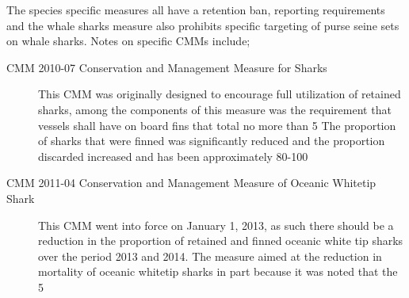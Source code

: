 \documentclass[12pt]{SCreport}
\begin{document}
The species specific measures all have a retention ban, reporting requirements and the whale sharks measure also prohibits specific targeting of purse seine sets on whale sharks. Notes on specific CMMs
include;
\begin{description}
 \item[CMM 2010-07 Conservation and Management Measure for Sharks] This CMM was originally designed to encourage full utilization of retained sharks, among the components of this measure was the requirement that vessels shall have on board fins that total no more than 5%
The proportion of sharks that were finned was significantly reduced and the proportion discarded increased and has been approximately 80-100%
 
 
 
 \item[CMM 2011-04 Conservation and Management Measure of Oceanic Whitetip Shark] This CMM went into force on January 1, 2013, as such there should be a reduction in the proportion of retained and finned oceanic white tip sharks over the period 2013 and 2014. The measure aimed at the reduction in mortality of oceanic whitetip sharks in part because it was noted that the 5%


\end{description}
\end{document}

